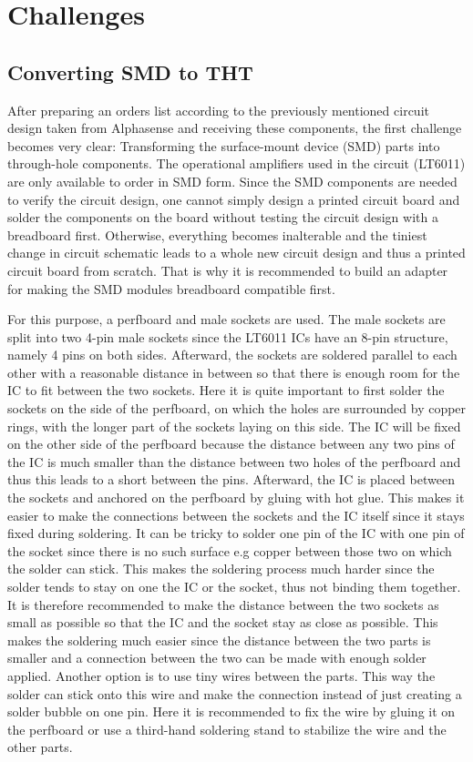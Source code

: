 \chapter{Challenges}
\label{sec:challenges}

\section{Converting SMD to THT}
After preparing an orders list according to the previously mentioned circuit design taken from Alphasense \cite{2009} and receiving these components, the first challenge becomes very clear: Transforming the surface-mount device (SMD) parts into through-hole components. The operational amplifiers used in the circuit (LT6011) are only available to order in SMD form. Since the SMD components are needed to verify the circuit design, one cannot simply design a printed circuit board and solder the components on the board without testing the circuit design with a breadboard first. Otherwise, everything becomes inalterable and the tiniest change in circuit schematic leads to a whole new circuit design and thus a printed circuit board from scratch. That is why it is recommended to build an adapter for making the SMD modules breadboard compatible first. \par 
For this purpose, a perfboard and male sockets are used. The male sockets are split into two 4-pin male sockets since the LT6011 ICs have an 8-pin structure, namely 4 pins on both sides. Afterward, the sockets are soldered parallel to each other with a reasonable distance in between so that there is enough room for the IC to fit between the two sockets. Here it is quite important to first solder the sockets on the side of the perfboard, on which the holes are surrounded by copper rings, with the longer part of the sockets laying on this side. The IC will be fixed on the other side of the perfboard because the distance between any two pins of the IC is much smaller than the distance between two holes of the perfboard and thus this leads to a short between the pins. Afterward, the IC is placed between the sockets and anchored on the perfboard by gluing with hot glue. This makes it easier to make the connections between the sockets and the IC itself since it stays fixed during soldering. It can be tricky to solder one pin of the IC with one pin of the socket since there is no such surface e.g copper between those two on which the solder can stick. This makes the soldering process much harder since the solder tends to stay on one the IC or the socket, thus not binding them together. It is therefore recommended to make the distance between the two sockets as small as possible so that the IC and the socket stay as close as possible. This makes the soldering much easier since the distance between the two parts is smaller and a connection between the two can be made with enough solder applied. Another option is to use tiny wires between the parts. This way the solder can stick onto this wire and make the connection instead of just creating a solder bubble on one pin. Here it is recommended to fix the wire by gluing it on the perfboard or use a third-hand soldering stand to stabilize the wire and the other parts.

